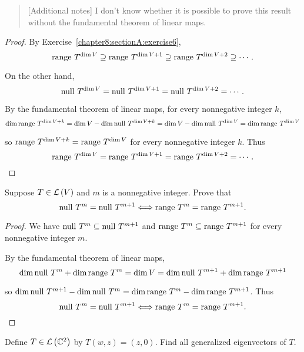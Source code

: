 \begin{quote}[Additional notes]
    I don't know whether it is possible to prove this result without the fundamental theorem of linear maps.
\end{quote}

\begin{proof}
    By Exercise~\ref{chapter8:sectionA:exercise6},
    \[
        \operatorname{range}\,{T^{\dim V}} \supseteq \operatorname{range}\,{T^{\dim V + 1}} \supseteq \operatorname{range}\,{T^{\dim V + 2}} \supseteq \cdots.
    \]

    On the other hand,
    \[
        \operatorname{null}\,{T^{\dim V}} = \operatorname{null}\,{T^{\dim V + 1}} = \operatorname{null}\,{T^{\dim V + 2}} = \cdots.
    \]

    By the fundamental theorem of linear maps, for every nonnegative integer $k$,
    \[
        \dim\operatorname{range}\,{T^{\dim V + k}} = \dim V - \dim\operatorname{null}\,{T^{\dim V + k}} = \dim V - \dim\operatorname{null}\,{T^{\dim V}} = \dim\operatorname{range}\,{T^{\dim V}}
    \]

    so $\operatorname{range}\,{T^{\dim V + k}} = \operatorname{range}\,{T^{\dim V}}$ for every nonnegative integer $k$. Thus
    \[
        \operatorname{range}\,{T^{\dim V}} = \operatorname{range}\,{T^{\dim V + 1}} = \operatorname{range}\,{T^{\dim V + 2}} = \cdots.\qedhere
    \]
\end{proof}
\newpage

\begin{exercise}\label{chapter8:sectionA:exercise9}
    Suppose $T\in\mathcal{L}\left({V}\right)$ and $m$ is a nonnegative integer. Prove that
    \[
        \operatorname{null}\,{T^{m}} = \operatorname{null}\,{T^{m+1}} \Longleftrightarrow \operatorname{range}\,{T^{m}} = \operatorname{range}\,{T^{m+1}}.
    \]
\end{exercise}

\begin{proof}
    We have $\operatorname{null}\,{T^{m}} \subseteq \operatorname{null}\,{T^{m+1}}$ and $\operatorname{range}\,{T^{m}} \subseteq \operatorname{range}\,{T^{m+1}}$ for every nonnegative integer $m$.

    By the fundamental theorem of linear maps,
    \[
        \dim\operatorname{null}\,{T^{m}} + \dim\operatorname{range}\,{T^{m}} = \dim V = \dim\operatorname{null}\,{T^{m+1}} + \dim\operatorname{range}\,{T^{m+1}}
    \]

    so $\dim\operatorname{null}\,{T^{m+1}} - \dim\operatorname{null}\,{T^{m}} = \dim\operatorname{range}\,{T^{m}} - \dim\operatorname{range}\,{T^{m+1}}$. Thus
    \[
        \operatorname{null}\,{T^{m}} = \operatorname{null}\,{T^{m+1}} \Longleftrightarrow \operatorname{range}\,{T^{m}} = \operatorname{range}\,{T^{m+1}}.\qedhere
    \]
\end{proof}
\newpage

\begin{exercise}\label{chapter8:sectionA:exercise10}
    Define $T\in\mathcal{L}\left({\mathbb{C}^{2}}\right)$ by $T(w, z) = (z, 0)$. Find all generalized eigenvectors of $T$.
\end{exercise}

